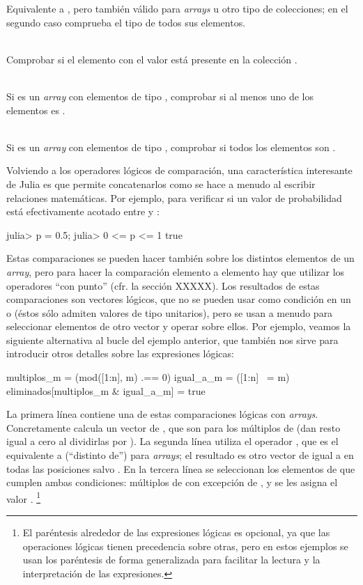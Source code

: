 ﻿\documentclass[spanish]{article}
\begin{document}
\begin{description}
  Equivalente a , pero también válido para \emph{arrays} u otro tipo de colecciones; en el segundo caso comprueba el tipo de todos sus elementos.
  \item[\code{in(el,x)}] \hfill \\
  Comprobar si el elemento con el valor  está presente en la colección .
  \item[\code{any(x)}] \hfill \\
  Si  es un \emph{array} con elementos de tipo , comprobar si al menos uno de los elementos es .
  \item[\code{all(x)}}] \hfill \\
  Si  es un \emph{array} con elementos de tipo , comprobar si todos los elementos son .
\end{description}

Volviendo a los operadores lógicos de comparación, una característica interesante de Julia es que permite concatenarlos como se hace a menudo al escribir relaciones matemáticas. Por ejemplo, para verificar si un valor de probabilidad  está efectivamente acotado entre  y :

julia> p = 0.5;
julia> 0 <= p <= 1
true

Estas comparaciones se pueden hacer también sobre los distintos elementos de un \emph{array}, pero para hacer la comparación elemento a elemento hay que utilizar los operadores ``con punto'' (cfr. la sección XXXXX). Los resultados de estas comparaciones son vectores lógicos, que no se pueden usar como condición en un  o  (éstos sólo admiten valores de tipo  unitarios), pero se usan a menudo para seleccionar elementos de otro vector y operar sobre ellos. Por ejemplo, veamos la siguiente alternativa al bucle  del ejemplo anterior, que también nos sirve para introducir otros detalles sobre las expresiones lógicas:

multiplos_m = (mod([1:n], m) .== 0)
igual_a_m = ([1:n] ~= m)
eliminados[multiplos_m & igual_a_m] = true

La primera línea contiene una de estas comparaciones lógicas con \emph{arrays}. Concretamente calcula un vector de , que son  para los múltiplos de  (dan resto igual a cero al dividirlas por ). La segunda línea utiliza el operador \code{~=}, que es el equivalente a \code{!=} (``distinto de'') para \emph{arrays}; el resultado es otro vector de  igual a  en todas las posiciones salvo . En la tercera línea se seleccionan los elementos de  que cumplen ambas condiciones: múltiplos de  con excepción de , y se les asigna el valor .%
\footnote{%
El paréntesis alrededor de las expresiones lógicas es opcional, ya que las operaciones lógicas tienen precedencia sobre otras, pero en estos ejemplos se usan los paréntesis de forma generalizada para facilitar la lectura y la interpretación de las expresiones.%
}
\end{document}
